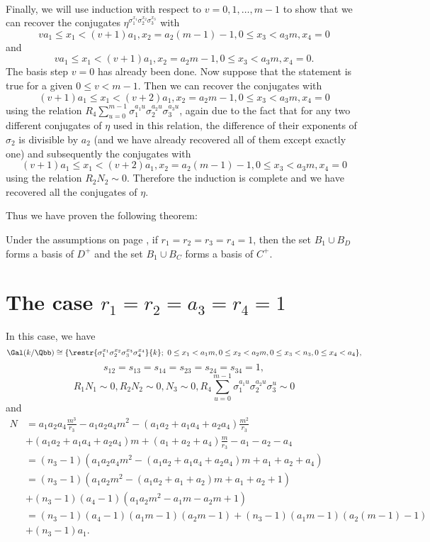 \paragraph*{}
Finally, we will use induction with respect to $v=0,1,\dots, m-1$ to show that we can recover the conjugates $\eta^{\sigma_1^{x_1}\sigma_2^{x_2}\sigma_3^{x_3}}$ with $$va_1\leq x_1 < (v+1)a_1,x_2=a_2(m-1)-1,0\le x_3<a_3m,x_4=0$$ and $$va_1\leq x_1 < (v+1)a_1,x_2=a_2m-1,0\le x_3<a_3m,x_4=0.$$
The basis step $v=0$ has already been done. Now suppose that the statement is true for a given $0\leq v<m-1$. Then we can recover the conjugates with $$(v+1)a_1\leq x_1 < (v+2)a_1,x_2=a_2m-1,0\le x_3<a_3m,x_4=0$$
using the relation $R_4\sum_{u=0}^{m-1}\sigma_1^{a_1u}\sigma_2^{a_2u}\sigma_3^{a_3u}$, again due to the fact that for any two different conjugates of $\eta$ used in this relation, the difference of their exponents of $\sigma_2$ is divisible by $a_2$ (and we have already recovered all of them except exactly one) and subsequently the conjugates with $$(v+1)a_1\leq x_1 < (v+2)a_1,x_2=a_2(m-1)-1,0\le x_3<a_3m,x_4=0$$ using the relation $R_2N_2\sim 0$.
Therefore the induction is complete and we have recovered all the conjugates of $\eta$. 

Thus we have proven the following theorem:
\begin{theorem}
Under the assumptions on page \pageref{assum}, if $r_1=r_2=r_3=r_4=1$, then the set $B_{1}\cup B_D$ forms a basis of $D^+$ and the set $B_{1}\cup B_C$ forms a basis of $C^+$.
\end{theorem}
\section{The case $r_1=r_2=a_3=r_4=1$}
In this case, we have
$$\Gal(k/\Qbb)\cong
 \{\restr{\sigma_1^{x_1}\sigma_2^{x_2}\sigma_3^{x_3}\sigma_4^{x_4}}{k};~  0\leq x_1<a_1m, 0\leq x_2<a_2m, 0\leq x_3<n_3,0\leq x_4<a_4\},$$
  $$s_{12}=s_{13}=s_{14}=s_{23}=s_{24}=s_{34}=1,$$
$$R_1N_1\sim 0, R_2N_2\sim 0, N_3 \sim 0, R_4 \sum_{u=0}^{m-1}\sigma_1^{a_1u}\sigma_2^{a_2u}\sigma_3^{u} \sim 0$$
and
\begin{align*}
N&=a_1a_2a_4\frac{m^3}{r_3}-a_1a_2a_4m^2-(a_1a_2+a_1a_4+a_2a_4)\frac{m^2}{r_3}\\
&+(a_1a_2+a_1a_4+a_2a_4)m+(a_1+a_2+a_4)\frac{m}{r_3}-a_1-a_2-a_4\\
&=(n_3-1)(a_1a_2a_4m^2-(a_1a_2+a_1a_4+a_2a_4)m+a_1+a_2+a_4)\\
&=(n_3-1)(a_1a_2m^2-(a_1a_2+a_1+a_2)m+a_1+a_2+1)\\
&+(n_3-1)(a_4-1)(a_1a_2m^2-a_1m-a_2m+1)\\
&=(n_3-1)(a_4-1)(a_1m-1)(a_2m-1)+(n_3-1)(a_1m-1)(a_2(m-1)-1)\\
&+(n_3-1)a_1.
\end{align*}

